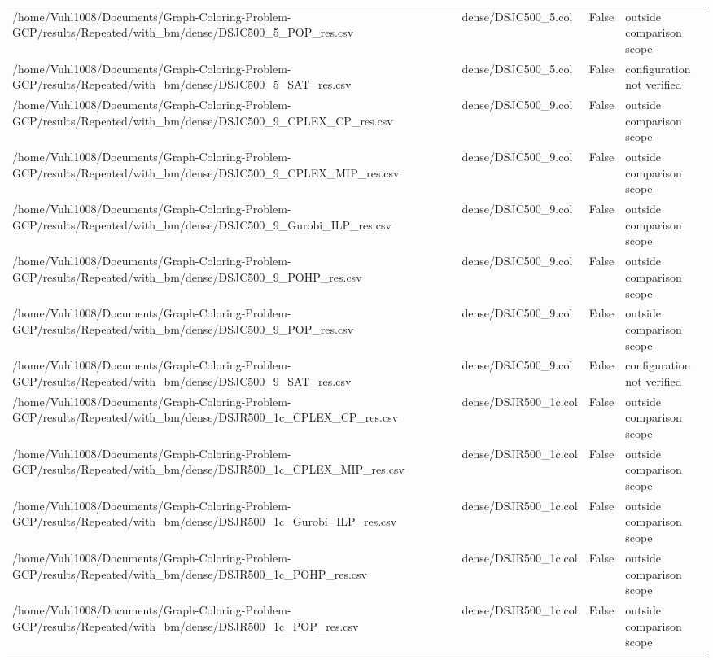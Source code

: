\begin{table}[htbp]
\begin{tabular}{llll}
/home/Vuhl1008/Documents/Graph-Coloring-Problem-GCP/results/Repeated/with\_bm/dense/DSJC500\_5\_POP\_res.csv & dense/DSJC500\_5.col & False & outside comparison scope \\
/home/Vuhl1008/Documents/Graph-Coloring-Problem-GCP/results/Repeated/with\_bm/dense/DSJC500\_5\_SAT\_res.csv & dense/DSJC500\_5.col & False & configuration not verified \\
/home/Vuhl1008/Documents/Graph-Coloring-Problem-GCP/results/Repeated/with\_bm/dense/DSJC500\_9\_CPLEX\_CP\_res.csv & dense/DSJC500\_9.col & False & outside comparison scope \\
/home/Vuhl1008/Documents/Graph-Coloring-Problem-GCP/results/Repeated/with\_bm/dense/DSJC500\_9\_CPLEX\_MIP\_res.csv & dense/DSJC500\_9.col & False & outside comparison scope \\
/home/Vuhl1008/Documents/Graph-Coloring-Problem-GCP/results/Repeated/with\_bm/dense/DSJC500\_9\_Gurobi\_ILP\_res.csv & dense/DSJC500\_9.col & False & outside comparison scope \\
/home/Vuhl1008/Documents/Graph-Coloring-Problem-GCP/results/Repeated/with\_bm/dense/DSJC500\_9\_POHP\_res.csv & dense/DSJC500\_9.col & False & outside comparison scope \\
/home/Vuhl1008/Documents/Graph-Coloring-Problem-GCP/results/Repeated/with\_bm/dense/DSJC500\_9\_POP\_res.csv & dense/DSJC500\_9.col & False & outside comparison scope \\
/home/Vuhl1008/Documents/Graph-Coloring-Problem-GCP/results/Repeated/with\_bm/dense/DSJC500\_9\_SAT\_res.csv & dense/DSJC500\_9.col & False & configuration not verified \\
/home/Vuhl1008/Documents/Graph-Coloring-Problem-GCP/results/Repeated/with\_bm/dense/DSJR500\_1c\_CPLEX\_CP\_res.csv & dense/DSJR500\_1c.col & False & outside comparison scope \\
/home/Vuhl1008/Documents/Graph-Coloring-Problem-GCP/results/Repeated/with\_bm/dense/DSJR500\_1c\_CPLEX\_MIP\_res.csv & dense/DSJR500\_1c.col & False & outside comparison scope \\
/home/Vuhl1008/Documents/Graph-Coloring-Problem-GCP/results/Repeated/with\_bm/dense/DSJR500\_1c\_Gurobi\_ILP\_res.csv & dense/DSJR500\_1c.col & False & outside comparison scope \\
/home/Vuhl1008/Documents/Graph-Coloring-Problem-GCP/results/Repeated/with\_bm/dense/DSJR500\_1c\_POHP\_res.csv & dense/DSJR500\_1c.col & False & outside comparison scope \\
/home/Vuhl1008/Documents/Graph-Coloring-Problem-GCP/results/Repeated/with\_bm/dense/DSJR500\_1c\_POP\_res.csv & dense/DSJR500\_1c.col & False & outside comparison scope \\

\end{tabular}
\end{table}
